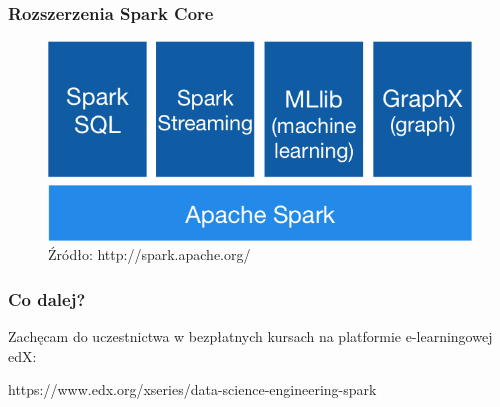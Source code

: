 \documentclass{beamer}\usepackage[]{graphicx}\usepackage[]{color}
\begin{document}
\begin{frame}
\frametitle{Rozszerzenia Spark Core}
\begin{figure}
\includegraphics[width=\textwidth]{spark_components.png}
  \vspace{-10pt}
  \caption{Źródło: http://spark.apache.org/}
\end{figure}
\end{frame}

\begin{frame}
\frametitle{Co dalej?}
Zachęcam do uczestnictwa w bezpłatnych kursach na platformie e-learningowej edX:

https://www.edx.org/xseries/data-science-engineering-spark

\end{frame}
\end{document}
